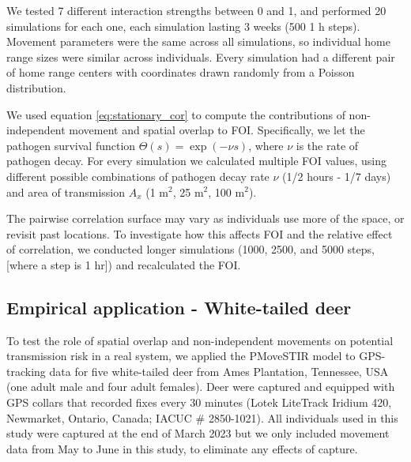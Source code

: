 \documentclass[letterpaper]{article}
\begin{document}
We tested 7 different interaction strengths between 0 and 1, and performed 20 simulations for each one, each simulation lasting 3 weeks (500 1 h steps). Movement parameters were the same across all simulations, so individual home range sizes were similar across individuals. Every simulation had a different pair of home range centers with coordinates drawn randomly from a Poisson distribution. %

We used equation \ref{eq:stationary_cor} to compute the contributions of non-independent movement and spatial overlap to FOI.  Specifically, we let the pathogen survival function $\Theta(s) = \exp(-\nu s)$, where $\nu$ is the rate of pathogen decay. For every simulation we calculated multiple FOI values, using different possible combinations of pathogen decay rate $\nu$ (1/2 hours - 1/7 days) and area of transmission $A_x$ (1 m$^2$, 25 m$^2$, 100 m$^2$). %

The pairwise correlation surface may vary as individuals use more of the space, or revisit past locations. To investigate how this affects FOI and the relative effect of correlation, we conducted longer simulations (1000, 2500, and 5000 steps, [where a step is 1 hr]) and recalculated the FOI. 

\subsection*{Empirical application - White-tailed deer}

To test the role of spatial overlap and non-independent movements on potential transmission risk in a real system, we applied the PMoveSTIR model to GPS-tracking data for five white-tailed deer from Ames Plantation, Tennessee, USA (one adult male and four adult females). 
Deer were captured and equipped with GPS collars that recorded fixes every 30 minutes (Lotek LiteTrack Iridium 420, Newmarket, Ontario, Canada; IACUC \# 2850-1021).  All individuals used in this study were captured at the end of March 2023 but we only included movement data from May to June in this study, to eliminate any effects of capture. 
\end{document}
